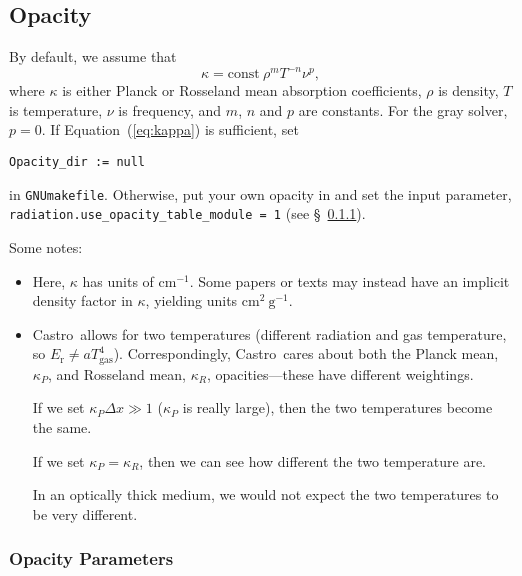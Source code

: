\documentclass[11pt,letterpaper]{article}
\newcommand{\castro}{{\sf Castro}}
\begin{document}
\subsection{Opacity}

By default, we assume that
\begin{equation}
  \kappa = \mathrm{const}\ \rho^{m} T^{-n} \nu^{p} , \label{eq:kappa}
\end{equation}
where $\kappa$ is either Planck or Rosseland mean absorption
coefficients, $\rho$ is density, $T$ is temperature, $\nu$ is
frequency, and $m$, $n$ and $p$ are constants.  For the gray solver,
$p = 0$.  If Equation~(\ref{eq:kappa}) is sufficient, set
\begin{verbatim}
Opacity_dir := null
\end{verbatim}
in {\tt GNUmakefile}.  Otherwise, put your own opacity in
{\tt{}} and set
the input parameter, {\tt radiation.use\_opacity\_table\_module = 1} (see
\S~\ref{sec:opacpars}).

Some notes:
\begin{itemize}
\item Here, $\kappa$ has units of $\mathrm{cm}^{-1}$.  Some papers or
  texts may instead have an implicit density factor in $\kappa$,
  yielding units $\mathrm{cm}^2~\mathrm{g}^{-1}$.

\item \castro\ allows for two temperatures (different radiation and gas
  temperature, so $E_\mathrm{r} \ne a T_\mathrm{gas}^4$).
  Correspondingly,  \castro\ cares about both the Planck mean,
  $\kappa_P$, and Rosseland mean, $\kappa_R$, opacities---these have
  different weightings.

  If we set $\kappa_P \Delta x \gg 1$ ($\kappa_P$ is really large),
  then the two temperatures become the same.

  If we set $\kappa_P = \kappa_R$, then we can see how different the
  two temperature are.

  In an optically thick medium, we would not expect the two temperatures
  to be very different.

\end{itemize}


\subsubsection{Opacity Parameters}
\label{sec:opacpars}
\end{document}

